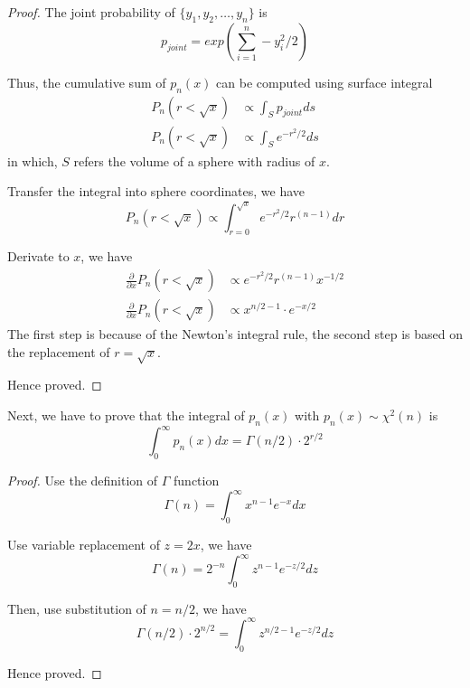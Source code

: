 \begin{proof}
    The joint probability of $\{y_1, y_2, \dots, y_n\}$ is
    \begin{equation*}
        p_{joint} = exp(\sum_{i=1}^{n}-y_i^2/2)
    \end{equation*}

    Thus, the cumulative sum of $p_n(x)$ can be computed using surface integral
    \begin{align*}
        P_n(r<\sqrt{x}) & \propto \int_{S} p_{joint} ds  \\
        P_n(r<\sqrt{x}) & \propto \int_{S} e^{-r^2/2} ds
    \end{align*}
    in which, $S$ refers the volume of a sphere with radius of $x$.

    Transfer the integral into sphere coordinates, we have
    \begin{equation*}
        P_n(r<\sqrt{x}) \propto \int_{r=0}^{\sqrt{x}} e^{-r^2/2} r^{(n-1)} dr
    \end{equation*}

    Derivate to $x$, we have
    \begin{align*}
        \frac{\partial}{\partial{x}} {P_n(r<\sqrt{x})} & \propto e^{-r^2/2} r^{(n-1)} x^{-1/2} \\
        \frac{\partial}{\partial{x}} {P_n(r<\sqrt{x})} & \propto x^{n/2-1} \cdot e^{-x/2}
    \end{align*}
    The first step is because of the Newton's integral rule, the second step is based on the replacement of $r = \sqrt{x}$.

    Hence proved.

\end{proof}

\begin{lemma}
    \label{lemma: The Pdf of Chi-squared Distribution is a Pdf}
    Next, we have to prove that the integral of $p_n(x)$ with $p_n(x) \sim \chi^2(n)$ is
    \begin{equation*}
        \int_0^\infty p_n(x) dx = \Gamma(n/2) \cdot 2^{r/2}
    \end{equation*}

\end{lemma}

\begin{proof}
    Use the definition of $\Gamma$ function
    \begin{equation*}
        \Gamma(n) = \int_0^\infty x^{n-1} e^{-x} dx
    \end{equation*}

    Use variable replacement of $z = 2x$, we have
    \begin{equation*}
        \Gamma(n) = 2^{-n} \int_0^\infty z^{n-1} e^{-z/2} dz
    \end{equation*}

    Then, use substitution of $n = n/2$, we have
    \begin{equation*}
        \Gamma(n/2) \cdot 2^{n/2} = \int_0^\infty z^{n/2-1} e^{-z/2} dz
    \end{equation*}

    Hence proved.

\end{proof}

